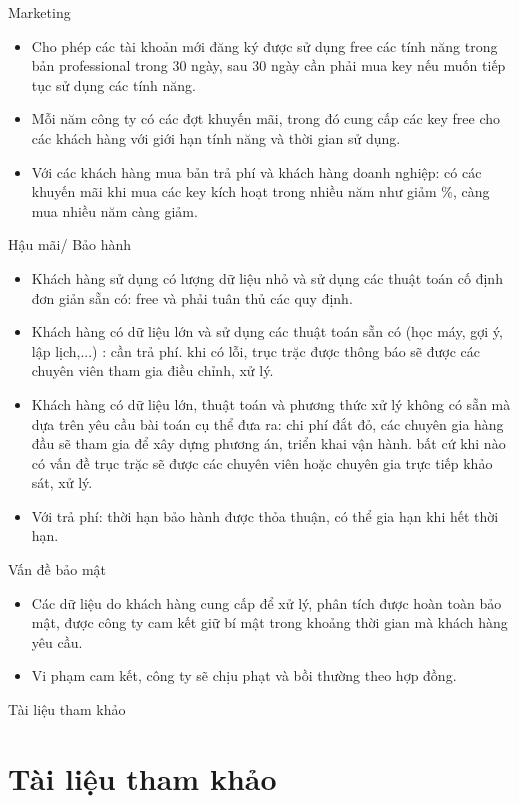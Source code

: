 \documentclass{beamer}
\begin{document}
\begin{frame}{Marketing}
\begin{itemize}
\item Cho phép các tài khoản mới đăng ký được sử dụng free các tính năng trong bản professional trong 30 ngày, sau 30 ngày cần phải mua key nếu muốn tiếp tục sử dụng các tính năng.
\item Mỗi năm công ty có các đợt khuyến mãi, trong đó cung cấp các key free cho các khách hàng với giới hạn tính năng và thời gian sử dụng.
\item Với các khách hàng mua bản trả phí và khách hàng doanh nghiệp: có các khuyến mãi khi mua các key kích hoạt trong nhiều năm như giảm \%, càng mua nhiều năm càng giảm.

\end{itemize}

\end{frame}
\begin{frame}{Hậu mãi/ Bảo hành}
\begin{itemize}
\item Khách hàng sử dụng có lượng dữ liệu nhỏ và sử dụng các thuật toán cố định đơn giản sẵn có: free và phải tuân thủ các quy định.
\item Khách hàng có dữ liệu lớn và sử dụng các thuật toán sẵn có (học máy, gợi ý, lập lịch,...) : cần trả phí. khi có lỗi, trục trặc được thông báo sẽ được các chuyên viên tham gia điều chỉnh, xử lý.
\item Khách hàng có dữ liệu lớn, thuật toán và phương thức xử lý không có sẵn mà dựa trên yêu cầu bài toán cụ thể đưa ra: chi phí đắt đỏ, các chuyên gia hàng đầu sẽ tham gia để xây dựng phương án, triển khai vận hành. bất cứ khi nào có vấn đề trục trặc sẽ được các chuyên viên hoặc chuyên gia trực tiếp khảo sát, xử lý.
\item Với trả phí: thời hạn bảo hành được thỏa thuận, có thể gia hạn khi hết thời hạn.

\end{itemize}
\end{frame}
\begin{frame}{Vấn đề bảo mật}
\begin{itemize}
\item Các dữ liệu do khách hàng cung cấp để xử lý, phân tích được hoàn toàn bảo mật, được công ty cam kết giữ bí mật trong khoảng thời gian mà khách hàng yêu cầu.
\item Vi phạm cam kết, công ty sẽ chịu phạt và bồi thường theo hợp đồng.

\end{itemize}
\end{frame}
\begin{frame}{Tài liệu tham khảo}
\section*{Tài liệu tham khảo}

\end{frame}
\end{document}
